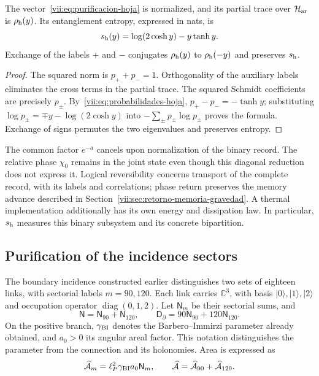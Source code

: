 \begin{proposition}
\label{vii:prop:purificacion-hoja}
The vector~\eqref{vii:eq:purificacion-hoja} is normalized, and its partial
trace over \(\mathcal H_{\rm ar}\) is \(\rho_{\rm h}(y)\).
Its entanglement entropy, expressed in nats, is
\begin{equation}
 s_{\rm h}(y)=\log(2\cosh y)-y\tanh y.
 \label{vii:eq:entropia-hoja}
\end{equation}
Exchange of the labels \(+\) and \(-\) conjugates
\(\rho_{\rm h}(y)\) to \(\rho_{\rm h}(-y)\) and preserves
\(s_{\rm h}\).
\end{proposition}
\begin{proof}
The squared norm is \(p_++p_-=1\). Orthogonality of the
auxiliary labels eliminates the cross terms in the partial trace.
The squared Schmidt coefficients are precisely \(p_\pm\).
By~\eqref{vii:eq:probabilidades-hoja},
\(p_+-p_-=-\tanh y\); substituting
\(\log p_\pm=\mp y-\log(2\cosh y)\) into
\(-\sum_\pm p_\pm\log p_\pm\) proves the formula.
Exchange of signs permutes the two eigenvalues and preserves entropy.
\end{proof}

The common factor \(e^{-a}\) cancels upon normalization of the binary record.
The relative phase \(\chi_0\) remains in the joint state even though this
diagonal reduction does not express it. Logical reversibility concerns
transport of the complete record, with its labels and correlations;
phase return preserves the memory advance described in
Section~\ref{vii:sec:retorno-memoria-gravedad}. A thermal implementation
additionally has its own energy and dissipation law. In particular,
\(s_{\rm h}\) measures this binary subsystem and its concrete bipartition.

\subsection{Purification of the incidence sectors}
\label{vii:subsec:purificacion-sectorial}

The boundary incidence constructed earlier distinguishes two sets
of eighteen links, with sectorial labels \(m=90,120\). Each link
carries \(\mathbb C^3\), with basis \(|0\rangle,|1\rangle,|2\rangle\)
and occupation operator \(\operatorname{diag}(0,1,2)\). Let
\(\mathsf N_m\) be their sectorial sums, and
\begin{equation}
 \mathsf N=\mathsf N_{90}+\mathsf N_{120},\qquad
 \mathsf D_\partial=90\mathsf N_{90}+120\mathsf N_{120}.
 \label{vii:eq:ocupaciones-sectoriales}
\end{equation}
On the positive branch, \(\gamma_{\rm BI}\) denotes the
Barbero--Immirzi parameter already obtained, and \(a_0>0\) its angular areal factor.
This notation distinguishes the parameter from the connection and its holonomies.
Area is expressed as
\begin{equation}
 \widehat{\mathcal A}_m=\ell_P^2\gamma_{\rm BI}a_0\mathsf N_m,
 \qquad
 \widehat{\mathcal A}=\widehat{\mathcal A}_{90}
                         +\widehat{\mathcal A}_{120}.
 \label{vii:eq:area-sectores}
\end{equation}

